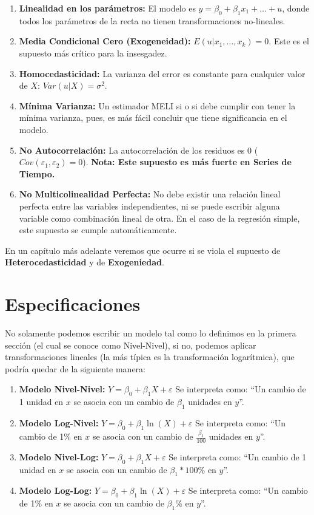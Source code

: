 \documentclass[
]{book}
\providecommand{\tightlist}{%
  \setlength{\itemsep}{0pt}\setlength{\parskip}{0pt}}
\begin{document}
\begin{enumerate}
\def\labelenumi{\arabic{enumi})}
\tightlist
\item
  \textbf{Linealidad en los parámetros:} El modelo es \(y = \beta_0 + \beta_1 x_1 + \dots + u\), donde todos los parámetros de la recta no tienen transformaciones no-lineales.
\item
  \textbf{Media Condicional Cero (Exogeneidad):} \(E(u | x_1, \dots, x_k) = 0\). Este es el supuesto más crítico para la insesgadez.
\item
  \textbf{Homocedasticidad:} La varianza del error es constante para cualquier valor de \(X\): \(Var(u | X) = \sigma^2\).
\item
  \textbf{Mínima Varianza:} Un estimador MELI si o si debe cumplir con tener la mínima varianza, pues, es más fácil concluir que tiene significancia en el modelo.
\item
  \textbf{No Autocorrelación:} La autocorrelación de los residuos es 0 (\(Cov(\varepsilon_1, \varepsilon_2) = 0\)). \textbf{Nota: Este supuesto es más fuerte en Series de Tiempo.}
\item
  \textbf{No Multicolinealidad Perfecta:} No debe existir una relación lineal perfecta entre las variables independientes, ni se puede escribir alguna variable como combinación lineal de otra. En el caso de la regresión simple, este supuesto se cumple automáticamente.
\end{enumerate}

En un capítulo más adelante veremos que ocurre si se viola el supuesto de \textbf{Heterocedasticidad} y de \textbf{Exogeniedad}.

\section{Especificaciones}\label{especificaciones}

No solamente podemos escribir un modelo tal como lo definimos en la primera sección (el cual se conoce como Nivel-Nivel), si no, podemos aplicar transformaciones lineales (la más típica es la transformación logarítmica), que podría quedar de la siguiente manera:

\begin{enumerate}
\def\labelenumi{\arabic{enumi})}
\tightlist
\item
  \textbf{Modelo Nivel-Nivel:} \(Y = \beta_0 + \beta_1X + \varepsilon\) Se interpreta como: ``Un cambio de 1 unidad en \(x\) se asocia con un cambio de \(\beta_1\) unidades en \(y\)''.
\item
  \textbf{Modelo Log-Nivel:} \(Y = \beta_0 + \beta_1\ln(X) + \varepsilon\) Se interpreta como: ``Un cambio de 1\% en \(x\) se asocia con un cambio de \(\frac{\beta_1}{100}\) unidades en \(y\)''.
\item
  \textbf{Modelo Nivel-Log:} \(Y = \beta_0 + \beta_1X + \varepsilon\) Se interpreta como: ``Un cambio de 1 unidad en \(x\) se asocia con un cambio de \(\beta_1*100\)\% en \(y\)''.
\item
  \textbf{Modelo Log-Log:} \(Y = \beta_0 + \beta_1\ln(X) + \varepsilon\) Se interpreta como: ``Un cambio de 1\% en \(x\) se asocia con un cambio de \(\beta_1\)\% en \(y\)''.
\end{enumerate}
\end{document}

